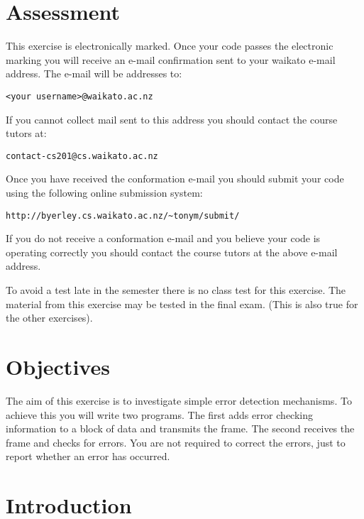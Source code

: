 \documentclass[a4paper,10pt]{article}
\begin{document}


\section{Assessment}

This exercise is electronically marked. Once your code passes the
electronic marking you will receive an e-mail confirmation sent to your
waikato e-mail address. The e-mail will be addresses to:

\begin{center}
\texttt{<your username>@waikato.ac.nz}
\end{center}

If you cannot collect mail sent to this address you should contact the
course tutors at:

\begin{center}
\texttt{contact-cs201@cs.waikato.ac.nz}
\end{center}

Once you have received the conformation e-mail you should submit your code
using the following online submission system:

\begin{center}
\verb+http://byerley.cs.waikato.ac.nz/~tonym/submit/+\\
\end{center}

If you do not receive a conformation e-mail and you believe your code is
operating correctly you should contact the course tutors at the above
e-mail address.

To avoid a test late in the semester there is no class test for this
exercise.  The material from this exercise may be tested in the final
exam. (This is also true for the other exercises).

\section{Objectives}

The aim of this exercise is to investigate simple error detection
mechanisms. To achieve this you will write two programs.  The first adds
error checking information to a block of data and transmits the frame.  The
second receives the frame and checks for errors.  You are not required to
correct the errors, just to report whether an error has occurred.

\section{Introduction} 
\end{document}
